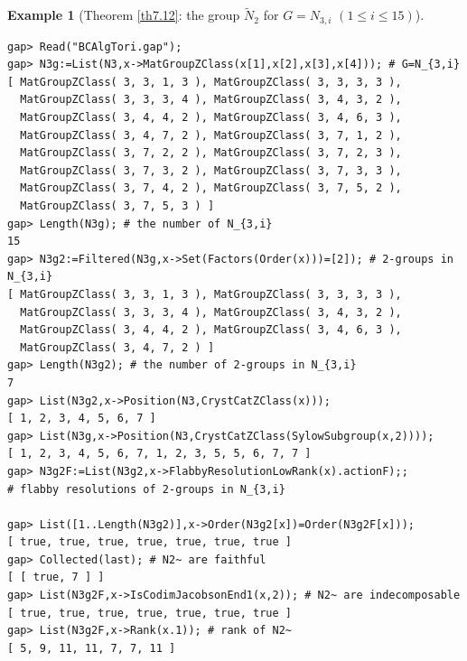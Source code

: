 \documentclass{amsart}
\theoremstyle{plain}
\theoremstyle{definition}
\newtheorem{example}[theorem]{Example}
\theoremstyle{remark}
\begin{document}
\bigskip
\begin{example}[Theorem \ref{th7.12}: the group $\widetilde{N}_2$ for $G=N_{3,i}$ $(1\leq i\leq 15)$]\label{ex7.14}~\vspace*{-5mm}\\
\begin{verbatim}
gap> Read("BCAlgTori.gap");
gap> N3g:=List(N3,x->MatGroupZClass(x[1],x[2],x[3],x[4])); # G=N_{3,i}
[ MatGroupZClass( 3, 3, 1, 3 ), MatGroupZClass( 3, 3, 3, 3 ), 
  MatGroupZClass( 3, 3, 3, 4 ), MatGroupZClass( 3, 4, 3, 2 ), 
  MatGroupZClass( 3, 4, 4, 2 ), MatGroupZClass( 3, 4, 6, 3 ), 
  MatGroupZClass( 3, 4, 7, 2 ), MatGroupZClass( 3, 7, 1, 2 ), 
  MatGroupZClass( 3, 7, 2, 2 ), MatGroupZClass( 3, 7, 2, 3 ), 
  MatGroupZClass( 3, 7, 3, 2 ), MatGroupZClass( 3, 7, 3, 3 ), 
  MatGroupZClass( 3, 7, 4, 2 ), MatGroupZClass( 3, 7, 5, 2 ), 
  MatGroupZClass( 3, 7, 5, 3 ) ]
gap> Length(N3g); # the number of N_{3,i}
15
gap> N3g2:=Filtered(N3g,x->Set(Factors(Order(x)))=[2]); # 2-groups in N_{3,i}
[ MatGroupZClass( 3, 3, 1, 3 ), MatGroupZClass( 3, 3, 3, 3 ), 
  MatGroupZClass( 3, 3, 3, 4 ), MatGroupZClass( 3, 4, 3, 2 ), 
  MatGroupZClass( 3, 4, 4, 2 ), MatGroupZClass( 3, 4, 6, 3 ), 
  MatGroupZClass( 3, 4, 7, 2 ) ]
gap> Length(N3g2); # the number of 2-groups in N_{3,i}
7
gap> List(N3g2,x->Position(N3,CrystCatZClass(x)));
[ 1, 2, 3, 4, 5, 6, 7 ]
gap> List(N3g,x->Position(N3,CrystCatZClass(SylowSubgroup(x,2))));
[ 1, 2, 3, 4, 5, 6, 7, 1, 2, 3, 5, 5, 6, 7, 7 ]
gap> N3g2F:=List(N3g2,x->FlabbyResolutionLowRank(x).actionF);; 
# flabby resolutions of 2-groups in N_{3,i}

gap> List([1..Length(N3g2)],x->Order(N3g2[x])=Order(N3g2F[x]));
[ true, true, true, true, true, true, true ]
gap> Collected(last); # N2~ are faithful
[ [ true, 7 ] ]
gap> List(N3g2F,x->IsCodimJacobsonEnd1(x,2)); # N2~ are indecomposable
[ true, true, true, true, true, true, true ]
gap> List(N3g2F,x->Rank(x.1)); # rank of N2~
[ 5, 9, 11, 11, 7, 7, 11 ]
\end{verbatim}
\end{example}
\end{document}
